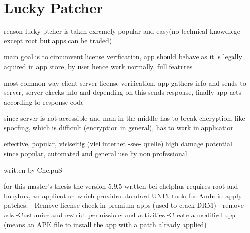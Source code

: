 \section{Lucky Patcher} \label{section:luckypatcher-explain}



%
reason lucky ptcher is taken exremely popular and easy(no technical knowdlege except root but apps can be traded)

main goal is to circumvent license verification, app should behave as it is legally aquired in app store, by user hence work normally, full features

most common way client-server license verification, app gathers info and sends to server, server checks info and depending on this sends response, finally app acts according to response code

since server is not accessible and man-in-the-middle has to break encryption, like spoofing, which is difficult (encryption in general), has to work in application

effective, popular, vielseitig (viel internet -see- quelle)
high damage potential since popular, automated and general use by non professional

\cite{munteanLicense}
%

written by ChelpuS

for this master's thesis the version 5.9.5
written bei chelphus
requires root and busybox, an application which provides standard UNIX tools for Android\cite{busyboxApp}
apply patches:
- Remove license check in premium apps (used to crack DRM)
- remove ads
-Customize and restrict permissions and activities
-Create a modified app (means an APK file to install the app with a patch already applied)

